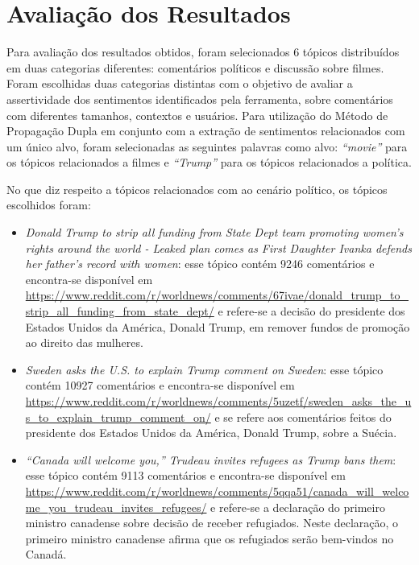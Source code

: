 \chapter{Avaliação dos Resultados}
\label{cap:impl}

Para avaliação dos resultados obtidos, foram
selecionados 6 tópicos distribuídos em duas categorias diferentes:
comentários políticos e discussão sobre filmes. Foram escolhidas duas
categorias distintas com o objetivo de avaliar a assertividade dos sentimentos identificados pela ferramenta, sobre
comentários com diferentes tamanhos, contextos e usuários. Para utilização do
Método de Propagação Dupla em conjunto com a extração de sentimentos
relacionados com um único alvo, foram selecionadas as seguintes palavras como
alvo: \textit{``movie''} para os tópicos relacionados a filmes e
\textit{``Trump''} para os tópicos relacionados a política.

No que diz respeito a tópicos relacionados com ao cenário político, os
tópicos escolhidos foram:
\begin{itemize}
  \item
  \textit{Donald Trump to strip all funding from State Dept team promoting
  women's rights around the world - Leaked plan comes as First Daughter Ivanka
  defends her father's record with women}: esse tópico contém 9246
  comentários e encontra-se disponível em
  \url{https://www.reddit.com/r/worldnews/comments/67ivae/donald_trump_to_strip_all_funding_from_state_dept/}
  e refere-se a decisão do presidente dos Estados Unidos da América, Donald
  Trump, em remover fundos de promoção ao direito das mulheres.  
  \item
  \textit{Sweden asks the U.S. to explain Trump comment on
  Sweden}: esse tópico contém 10927
  comentários e encontra-se disponível em
  \url{https://www.reddit.com/r/worldnews/comments/5uzetf/sweden_asks_the_us_to_explain_trump_comment_on/}
  e se refere aos comentários feitos do presidente dos Estados Unidos da
  América, Donald Trump, sobre a Suécia.
  
  \item\textit{“Canada will welcome you,” Trudeau invites refugees as Trump bans
  them}: esse tópico contém 9113
  comentários e encontra-se disponível em
  \url{https://www.reddit.com/r/worldnews/comments/5qqa51/canada_will_welcome_you_trudeau_invites_refugees/}
  e refere-se a declaração do primeiro ministro canadense sobre decisão de
  receber refugiados. Neste declaração, o primeiro ministro canadense afirma que
  os refugiados serão bem-vindos no Canadá.
\end{itemize}

